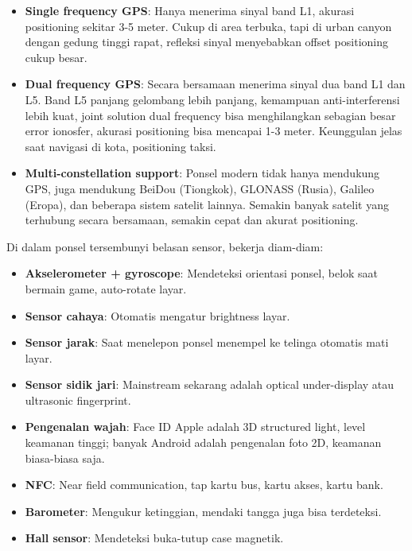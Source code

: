 \begin{itemize}
  \item \textbf{Single frequency GPS}: Hanya menerima sinyal band L1, akurasi positioning sekitar 3-5 meter. Cukup di area terbuka, tapi di urban canyon dengan gedung tinggi rapat, refleksi sinyal menyebabkan offset positioning cukup besar.
  \item \textbf{Dual frequency GPS}: Secara bersamaan menerima sinyal dua band L1 dan L5. Band L5 panjang gelombang lebih panjang, kemampuan anti-interferensi lebih kuat, joint solution dual frequency bisa menghilangkan sebagian besar error ionosfer, akurasi positioning bisa mencapai 1-3 meter. Keunggulan jelas saat navigasi di kota, positioning taksi.
  \item \textbf{Multi-constellation support}: Ponsel modern tidak hanya mendukung GPS, juga mendukung BeiDou (Tiongkok), GLONASS (Rusia), Galileo (Eropa), dan beberapa sistem satelit lainnya. Semakin banyak satelit yang terhubung secara bersamaan, semakin cepat dan akurat positioning.
\end{itemize}


Di dalam ponsel tersembunyi belasan sensor, bekerja diam-diam:

\begin{itemize}
  \item \textbf{Akselerometer + gyroscope}: Mendeteksi orientasi ponsel, belok saat bermain game, auto-rotate layar.
  \item \textbf{Sensor cahaya}: Otomatis mengatur brightness layar.
  \item \textbf{Sensor jarak}: Saat menelepon ponsel menempel ke telinga otomatis mati layar.
  \item \textbf{Sensor sidik jari}: Mainstream sekarang adalah optical under-display atau ultrasonic fingerprint.
  \item \textbf{Pengenalan wajah}: Face ID Apple adalah 3D structured light, level keamanan tinggi; banyak Android adalah pengenalan foto 2D, keamanan biasa-biasa saja.
  \item \textbf{NFC}: Near field communication, tap kartu bus, kartu akses, kartu bank.
  \item \textbf{Barometer}: Mengukur ketinggian, mendaki tangga juga bisa terdeteksi.
  \item \textbf{Hall sensor}: Mendeteksi buka-tutup case magnetik.
\end{itemize}

